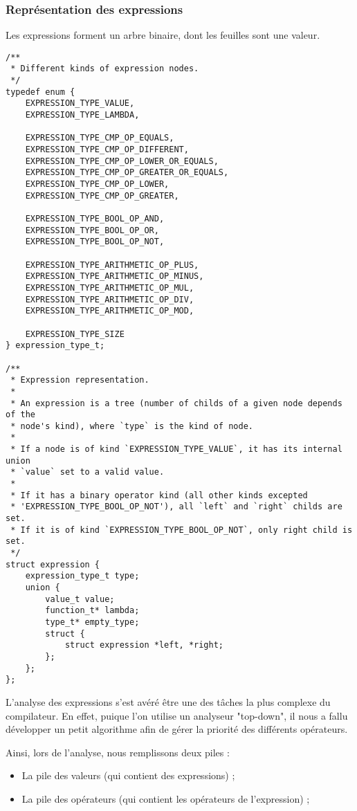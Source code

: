 \subsubsection{Représentation des expressions}

Les expressions forment un arbre binaire, dont les feuilles sont une valeur.

\begin{verbatim}
/**
 * Different kinds of expression nodes.
 */
typedef enum {
    EXPRESSION_TYPE_VALUE,
    EXPRESSION_TYPE_LAMBDA,

    EXPRESSION_TYPE_CMP_OP_EQUALS,
    EXPRESSION_TYPE_CMP_OP_DIFFERENT,
    EXPRESSION_TYPE_CMP_OP_LOWER_OR_EQUALS,
    EXPRESSION_TYPE_CMP_OP_GREATER_OR_EQUALS,
    EXPRESSION_TYPE_CMP_OP_LOWER,
    EXPRESSION_TYPE_CMP_OP_GREATER,

    EXPRESSION_TYPE_BOOL_OP_AND,
    EXPRESSION_TYPE_BOOL_OP_OR,
    EXPRESSION_TYPE_BOOL_OP_NOT,

    EXPRESSION_TYPE_ARITHMETIC_OP_PLUS,
    EXPRESSION_TYPE_ARITHMETIC_OP_MINUS,
    EXPRESSION_TYPE_ARITHMETIC_OP_MUL,
    EXPRESSION_TYPE_ARITHMETIC_OP_DIV,
    EXPRESSION_TYPE_ARITHMETIC_OP_MOD,

    EXPRESSION_TYPE_SIZE
} expression_type_t;

/**
 * Expression representation.
 *
 * An expression is a tree (number of childs of a given node depends of the
 * node's kind), where `type` is the kind of node.
 *
 * If a node is of kind `EXPRESSION_TYPE_VALUE`, it has its internal union
 * `value` set to a valid value.
 *
 * If it has a binary operator kind (all other kinds excepted
 * 'EXPRESSION_TYPE_BOOL_OP_NOT'), all `left` and `right` childs are set.
 * If it is of kind `EXPRESSION_TYPE_BOOL_OP_NOT`, only right child is set.
 */
struct expression {
    expression_type_t type;
    union {
        value_t value;
        function_t* lambda;
        type_t* empty_type;
        struct {
            struct expression *left, *right;
        };
    };
};
\end{verbatim}

L'analyse des expressions s'est avéré être une des tâches la plus complexe du
compilateur. En effet, puique l'on utilise un analyseur "top-down", il nous a
fallu développer un petit algorithme afin de gérer la priorité des différents
opérateurs.

Ainsi, lors de l'analyse, nous remplissons deux piles :
\begin{itemize}
    \item La pile des valeurs (qui contient des expressions) ;
    \item La pile des opérateurs (qui contient les opérateurs de l'expression) ;
\end{itemize}

